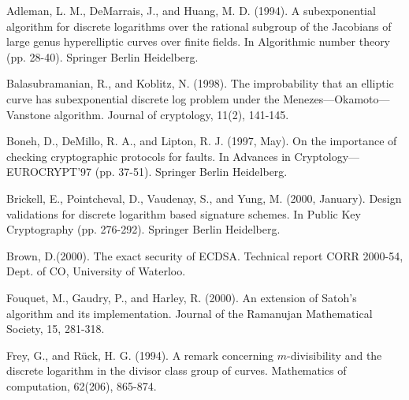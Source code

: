 \documentclass[11pt]{article}
\numberwithin{equation}{section} %
\numberwithin{figure}{section} %
\numberwithin{table}{section} %
\begin{document}
\begin{thebibliography}{99}


	Adleman, L. M., DeMarrais, J., and Huang, M. D. (1994). A subexponential algorithm for discrete logarithms over the rational subgroup of the Jacobians of large genus hyperelliptic curves over finite fields. In Algorithmic number theory (pp. 28-40). Springer Berlin Heidelberg.

	Balasubramanian, R., and Koblitz, N. (1998). The improbability that an elliptic curve has subexponential discrete log problem under the Menezes—Okamoto—Vanstone algorithm. Journal of cryptology, 11(2), 141-145.

	Boneh, D., DeMillo, R. A., and Lipton, R. J. (1997, May). On the importance of checking cryptographic protocols for faults. In Advances in Cryptology—EUROCRYPT’97 (pp. 37-51). Springer Berlin Heidelberg.
	
	Brickell, E., Pointcheval, D., Vaudenay, S., and Yung, M. (2000, January). Design validations for discrete logarithm based signature schemes. In Public Key Cryptography (pp. 276-292). Springer Berlin Heidelberg.

	Brown, D.(2000). The exact security of ECDSA. Technical report CORR 2000-54, Dept. of CO, University of Waterloo.

	Fouquet, M., Gaudry, P., and Harley, R. (2000). An extension of Satoh's algorithm and its implementation. Journal of the Ramanujan Mathematical Society, 15, 281-318.

	Frey, G., and Rück, H. G. (1994). A remark concerning $m$-divisibility and the discrete logarithm in the divisor class group of curves. Mathematics of computation, 62(206), 865-874.


\end{thebibliography}
\end{document}
